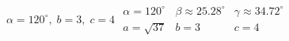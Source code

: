 { $\alpha = 120^{\circ}, \; b = 3, \; c = 4$}
{ $\begin{array}{lll}\alpha = 120^{\circ} & \beta \approx 25.28^{\circ} & \gamma \approx 34.72^{\circ} \\a = \sqrt{37} & b = 3 & c = 4 \end{array}$}
